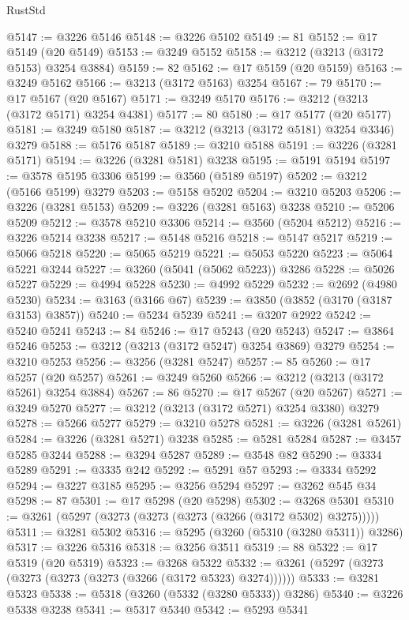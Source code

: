 \begin{lexlean}{RustStd}
\begin{coremodule}
@5147 := @3226 @5146
@5148 := @3226 @5102
@5149 := 81
@5152 := @17 @5149 (@20 @5149)
@5153 := @3249 @5152
@5158 := @3212 (@3213 (@3172 @5153) @3254 @3884)
@5159 := 82
@5162 := @17 @5159 (@20 @5159)
@5163 := @3249 @5162
@5166 := @3213 (@3172 @5163) @3254
@5167 := 79
@5170 := @17 @5167 (@20 @5167)
@5171 := @3249 @5170
@5176 := @3212 (@3213 (@3172 @5171) @3254 @4381)
@5177 := 80
@5180 := @17 @5177 (@20 @5177)
@5181 := @3249 @5180
@5187 := @3212 (@3213 (@3172 @5181) @3254 @3346) @3279
@5188 := @5176 @5187
@5189 := @3210 @5188
@5191 := @3226 (@3281 @5171)
@5194 := @3226 (@3281 @5181) @3238
@5195 := @5191 @5194
@5197 := @3578 @5195 @3306
@5199 := @3560 (@5189 @5197)
@5202 := @3212 (@5166 @5199) @3279
@5203 := @5158 @5202
@5204 := @3210 @5203
@5206 := @3226 (@3281 @5153)
@5209 := @3226 (@3281 @5163) @3238
@5210 := @5206 @5209
@5212 := @3578 @5210 @3306
@5214 := @3560 (@5204 @5212)
@5216 := @3226 @5214 @3238
@5217 := @5148 @5216
@5218 := @5147 @5217
@5219 := @5066 @5218
@5220 := @5065 @5219
@5221 := @5053 @5220
@5223 := @5064 @5221 @3244
@5227 := @3260 (@5041 (@5062 @5223)) @3286
@5228 := @5026 @5227
@5229 := @4994 @5228
@5230 := @4992 @5229
@5232 := @2692 (@4980 @5230)
@5234 := @3163 (@3166 @67)
@5239 := @3850 (@3852 (@3170 (@3187 @3153) @3857))
@5240 := @5234 @5239
@5241 := @3207 @2922
@5242 := @5240 @5241
@5243 := 84
@5246 := @17 @5243 (@20 @5243)
@5247 := @3864 @5246
@5253 := @3212 (@3213 (@3172 @5247) @3254 @3869) @3279
@5254 := @3210 @5253
@5256 := @3256 (@3281 @5247)
@5257 := 85
@5260 := @17 @5257 (@20 @5257)
@5261 := @3249 @5260
@5266 := @3212 (@3213 (@3172 @5261) @3254 @3884)
@5267 := 86
@5270 := @17 @5267 (@20 @5267)
@5271 := @3249 @5270
@5277 := @3212 (@3213 (@3172 @5271) @3254 @3380) @3279
@5278 := @5266 @5277
@5279 := @3210 @5278
@5281 := @3226 (@3281 @5261)
@5284 := @3226 (@3281 @5271) @3238
@5285 := @5281 @5284
@5287 := @3457 @5285 @3244
@5288 := @3294 @5287
@5289 := @3548 @82
@5290 := @3334 @5289
@5291 := @3335 @242
@5292 := @5291 @57
@5293 := @3334 @5292
@5294 := @3227 @3185
@5295 := @3256 @5294
@5297 := @3262 @545 @34
@5298 := 87
@5301 := @17 @5298 (@20 @5298)
@5302 := @3268 @5301
@5310 := @3261 (@5297 (@3273 (@3273 (@3273 (@3266 (@3172 @5302) @3275)))))
@5311 := @3281 @5302
@5316 := @5295 (@3260 (@5310 (@3280 @5311)) @3286)
@5317 := @3226 @5316
@5318 := @3256 @3511
@5319 := 88
@5322 := @17 @5319 (@20 @5319)
@5323 := @3268 @5322
@5332 := @3261 (@5297 (@3273 (@3273 (@3273 (@3273 (@3266 (@3172 @5323) @3274))))))
@5333 := @3281 @5323
@5338 := @5318 (@3260 (@5332 (@3280 @5333)) @3286)
@5340 := @3226 @5338 @3238
@5341 := @5317 @5340
@5342 := @5293 @5341

\end{coremodule}
\end{lexlean}
